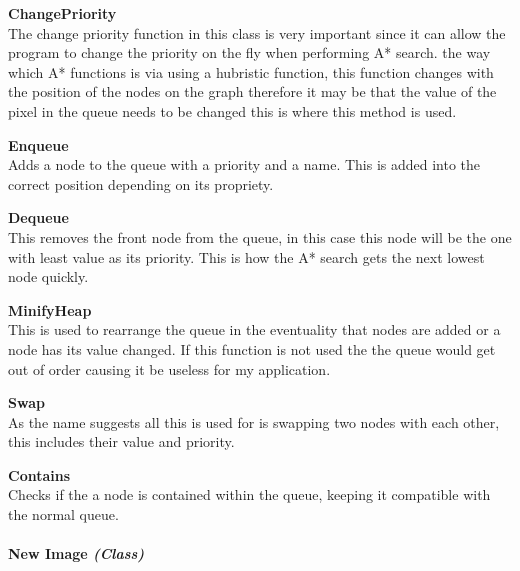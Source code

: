 \begin{FlushLeft}
    \textbf{ChangePriority} \\ \bk
    The change priority function in this class is very important since it can allow the program to change the priority on the fly when performing A* search. the way which A* functions is via using a hubristic function, this function changes with the position of the nodes on the graph therefore it may be that the value of the pixel in the queue needs to be changed this is where this method is used.  \\ \bk

    \textbf{Enqueue} \\ \bk
    Adds a node to the queue with a priority and a name. This is added into the correct position depending on its propriety.\\ \bk

    \textbf{Dequeue} \\ \bk
    This removes the front node from the queue, in this case this node will be the one with least value as its priority. This is how the A* search gets the next lowest node quickly.\\ \bk

    \textbf{MinifyHeap} \\ \bk
    This is used to rearrange the queue in the eventuality that nodes are added or a node has its value changed. If this function is not used the the queue would get out of order causing it be useless for my application.

    \textbf{Swap} \\ \bk
    As the name suggests all this is used for is swapping two nodes with each other, this includes their value and priority.

    \textbf{Contains} \\ \bk
    Checks if the a node is contained within the queue, keeping it compatible with the normal queue.

    \bk
\pagebreak
\paragraph{New Image \textit{(Class)}} \mbox{} \\

    \begin{figure}[H]
        \centering
    \end{figure}\\


\end{FlushLeft}
